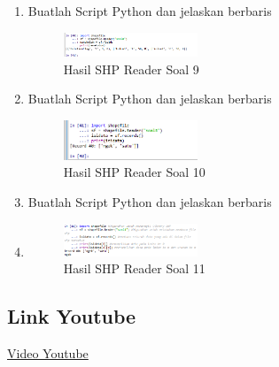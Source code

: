 \begin{enumerate}
    \item Buatlah Script Python dan jelaskan berbaris
    
    \hfill\break
    \begin{figure}[H]
		\includegraphics[width=4cm]{figures/1174095/3/9.png}
		\centering
		\caption{Hasil SHP Reader Soal 9}
    \end{figure}

    \item Buatlah Script Python dan jelaskan berbaris
    
    \hfill\break
    \begin{figure}[H]
		\includegraphics[width=4cm]{figures/1174095/3/10.png}
		\centering
		\caption{Hasil SHP Reader Soal 10}
    \end{figure}

     \item Buatlah Script Python dan jelaskan berbaris
    \item 
    \hfill\break
    \begin{figure}[H]
		\includegraphics[width=4cm]{figures/1174027/3/soal11.png}
		\centering
		\caption{Hasil SHP Reader Soal 11}
    \end{figure}
\end{enumerate}
\subsection{Link Youtube}
\href{https://youtu.be/ZcSSTLyMdXE}{Video Youtube}